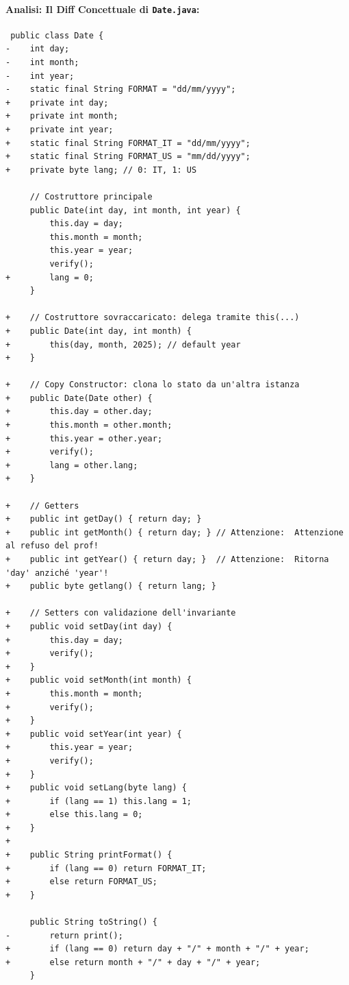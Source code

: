 \documentclass[11pt,a4paper]{article}
\begin{document}
\paragraph{\texorpdfstring{Analisi: Il Diff Concettuale di
\texttt{Date.java}:}{Analisi: Il Diff Concettuale di Date.java:}}\label{analisi-il-diff-concettuale-di-date.java}

\begin{lstlisting}
 public class Date {
-    int day;
-    int month;
-    int year;
-    static final String FORMAT = "dd/mm/yyyy";
+    private int day;
+    private int month;
+    private int year;
+    static final String FORMAT_IT = "dd/mm/yyyy";
+    static final String FORMAT_US = "mm/dd/yyyy";
+    private byte lang; // 0: IT, 1: US

     // Costruttore principale
     public Date(int day, int month, int year) {
         this.day = day;
         this.month = month;
         this.year = year;
         verify();
+        lang = 0;
     }

+    // Costruttore sovraccaricato: delega tramite this(...)
+    public Date(int day, int month) {
+        this(day, month, 2025); // default year
+    }

+    // Copy Constructor: clona lo stato da un'altra istanza
+    public Date(Date other) {
+        this.day = other.day;
+        this.month = other.month;
+        this.year = other.year;
+        verify();
+        lang = other.lang;
+    }

+    // Getters
+    public int getDay() { return day; }
+    public int getMonth() { return day; } // Attenzione:  Attenzione al refuso del prof!
+    public int getYear() { return day; }  // Attenzione:  Ritorna 'day' anziché 'year'!
+    public byte getlang() { return lang; }

+    // Setters con validazione dell'invariante
+    public void setDay(int day) {
+        this.day = day;
+        verify();
+    }
+    public void setMonth(int month) {
+        this.month = month;
+        verify();
+    }
+    public void setYear(int year) {
+        this.year = year;
+        verify();
+    }
+    public void setLang(byte lang) {
+        if (lang == 1) this.lang = 1;
+        else this.lang = 0;
+    }
+
+    public String printFormat() {
+        if (lang == 0) return FORMAT_IT;
+        else return FORMAT_US;
+    }

     public String toString() {
-        return print();
+        if (lang == 0) return day + "/" + month + "/" + year;
+        else return month + "/" + day + "/" + year;
     }
\end{lstlisting}
\end{document}
